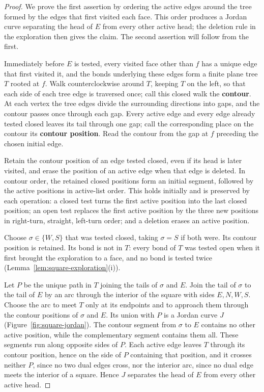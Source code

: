 \documentclass[11pt]{amsart}
\theoremstyle{plain}
\theoremstyle{definition}
\newcommand{\defn}[1]{\textbf{#1}}
\begin{document}
	\begin{proof}
		We prove the first assertion by ordering the active edges around the tree
		formed by the edges that first visited each face.  This order produces a Jordan curve separating
		the head of $E$ from every other active head; the deletion rule in the exploration then gives the
		claim.  The second assertion will follow from the first.

		Immediately before $E$ is tested, every visited face other than $f$ has a unique
		edge that first visited it, and the bonds underlying these edges form a finite
		plane tree $T$ rooted at $f$.  Walk counterclockwise around $T$, keeping $T$ on
		the left, so that each side of each tree edge is traversed once; call this
		closed walk the \defn{contour}.  At each vertex the tree edges divide the
		surrounding directions into gaps, and the contour passes once through each gap.
		Every active edge and every edge already tested closed leaves its tail through
		one gap; call the corresponding place on the contour its \defn{contour
		position}.  Read the contour from the gap at $f$ preceding the chosen initial
		edge.

		Retain the contour position of an edge tested closed, even if its head is later
		visited, and erase the position of an active edge when that edge is deleted.
		In contour order, the retained closed positions form an initial segment,
		followed by the active positions in active-list order.  This holds initially
		and is preserved by each operation: a closed test turns the first active
		position into the last closed position; an open test replaces the first active
		position by the three new positions in right-turn, straight, left-turn order;
		and a deletion erases an active position.

		Choose $\sigma\in\{W,S\}$ that was tested closed, taking $\sigma=S$ if both
		were.  Its contour position is retained.
		Its bond is not in $T$: every bond of $T$ was tested open when it first brought
		the exploration to a face, and no bond is tested twice
		(Lemma~\ref{lem:square-exploration}\textup{(i)}).

		Let $P$ be the unique path in $T$ joining the tails of $\sigma$ and $E$.  Join
		the tail of $\sigma$ to the tail of $E$ by an arc through the interior of the
		square with sides $E,N,W,S$.  Choose the arc to meet $T$ only at its endpoints
		and to approach them through the contour positions of $\sigma$ and $E$.  Its
		union with $P$ is a Jordan curve $J$
		(Figure~\ref{fig:square-jordan}).  The contour segment from $\sigma$ to $E$
		contains no other active position, while the complementary segment contains
		them all.  These segments run along opposite sides of $P$.  Each active edge
		leaves $T$ through its contour position, hence on the side of $P$ containing
		that position, and it crosses neither $P$, since no two dual edges cross, nor
		the interior arc, since no dual edge meets the interior of a square.  Hence $J$ separates the head of $E$ from every other
		active head.


\end{proof}
\end{document}
